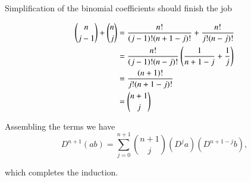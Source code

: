 Simplification of the binomial coefficients should finish the job

\begin{align*}
\binom{n}{j-1} + \binom{n}{j} 
&=
\frac{n!}{(j-1)!(n+1-j)!}
+\frac{n!}{j!(n-j)!} \\
&=
\frac{n!}{(j-1)!(n-j)!} \left( 
\frac{1}{n+1-j} + \frac{1}{j}
\right) \\
&=
\frac{(n+1)!}{j!(n+1-j)!} \\
&=
\binom{n+1}{j}
\end{align*}

Assembling the terms we have
\begin{equation}\label{eqn:productDerivativeInduction:50}
D^{n+1} (a b)
=
\sum_{j=0}^{n+1} \binom{n+1}{j}
(D^{j} a)(D^{n+1-j} b),
\end{equation}

which completes the induction.

\EndNoBibArticle
